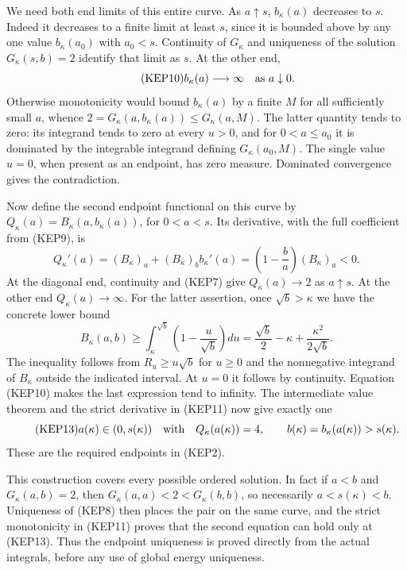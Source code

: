 We need both end limits of this entire curve. As $a\uparrow s$,
$b_\kappa(a)$ decreases to $s$. Indeed it decreases to a finite limit at
least $s$, since it is bounded above by any one value $b_\kappa(a_0)$ with
$a_0<s$. Continuity of $G_\kappa$ and uniqueness of the solution
$G_\kappa(s,b)=2$ identify that limit as $s$. At the other end,
\begin{equation}\tag{KEP10}
 b_\kappa(a)\longrightarrow\infty\quad\hbox{as }a\downarrow0.
\end{equation}
Otherwise monotonicity would bound $b_\kappa(a)$ by a finite $M$ for all
sufficiently small $a$, whence $2=G_\kappa(a,b_\kappa(a))\leq G_\kappa(a,M)$.
The latter quantity tends to zero: its integrand tends to zero at
every $u>0$, and for $0<a\leq a_0$ it is dominated by the integrable
integrand defining $G_\kappa(a_0,M)$. The single value $u=0$, when present
as an endpoint, has zero measure. Dominated convergence gives the
contradiction.

Now define the second endpoint functional on this curve by
$Q_\kappa(a)=B_\kappa(a,b_\kappa(a))$, for $0<a<s$. Its derivative, with the full
coefficient from (KEP9), is
\begin{equation}\tag{KEP11}
 Q_\kappa'(a)=(B_\kappa)_a+(B_\kappa)_b b_\kappa'(a)
       =\left(1-\frac ba\right)(B_\kappa)_a<0.
\end{equation}
At the diagonal end, continuity and (KEP7) give
$Q_\kappa(a)\to2$ as $a\uparrow s$. At the other end $Q_\kappa(a)\to\infty$.
For the latter assertion, once $\sqrt b>\kappa$ we have the concrete lower
bound
\begin{equation}\tag{KEP12}
 B_\kappa(a,b)\geq\int_\kappa^{\sqrt b}
               \left(1-\frac u{\sqrt b}\right)du
 =\frac{\sqrt b}{2}-\kappa+\frac{\kappa^2}{2\sqrt b}.
\end{equation}
The inequality follows from $R_u\geq u\sqrt b$ for $u\geq0$ and
the nonnegative integrand of $B_\kappa$ outside the indicated interval.
At $u=0$ it follows by continuity. Equation (KEP10) makes the last
expression tend to infinity. The intermediate value theorem and the
strict derivative in (KEP11) now give exactly one
\begin{equation}\tag{KEP13}
 a(\kappa)\in(0,s(\kappa))\quad\hbox{with}\quad Q_\kappa(a(\kappa))=4,
 \qquad b(\kappa)=b_\kappa(a(\kappa))>s(\kappa).
\end{equation}
These are the required endpoints in (KEP2).

This construction covers every possible ordered solution. In fact if
$a<b$ and $G_\kappa(a,b)=2$, then
$G_\kappa(a,a)<2<G_\kappa(b,b)$, so necessarily $a<s(\kappa)<b$.
Uniqueness of (KEP8) then places the pair on the same curve, and the
strict monotonicity in (KEP11) proves that the second equation can
hold only at (KEP13). Thus the endpoint uniqueness is proved directly
from the actual integrals, before any use of global energy uniqueness.

